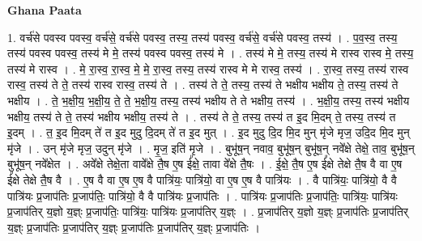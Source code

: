 \documentclass[17pt]{extarticle}
\begin{document}
\textbf{Ghana Paata } \newline

1. वर्च॑से पवस्व पवस्व॒ वर्च॑से॒ वर्च॑से पवस्व॒ तस्य॒ तस्य॑ पवस्व॒ वर्च॑से॒ वर्च॑से पवस्व॒ तस्य॑ । . प॒व॒स्व॒ तस्य॒ तस्य॑ पवस्व पवस्व॒ तस्य॑ मे मे॒ तस्य॑ पवस्व पवस्व॒ तस्य॑ मे । . तस्य॑ मे मे॒ तस्य॒ तस्य॑ मे रास्व रास्व मे॒ तस्य॒ तस्य॑ मे रास्व । . मे॒ रा॒स्व॒ रा॒स्व॒ मे॒ मे॒ रा॒स्व॒ तस्य॒ तस्य॑ रास्व मे मे रास्व॒ तस्य॑ । . रा॒स्व॒ तस्य॒ तस्य॑ रास्व रास्व॒ तस्य॑ ते ते॒ तस्य॑ रास्व रास्व॒ तस्य॑ ते । . तस्य॑ ते ते॒ तस्य॒ तस्य॑ ते भक्षीय भक्षीय ते॒ तस्य॒ तस्य॑ ते भक्षीय । . ते॒ भ॒क्षी॒य॒ भ॒क्षी॒य॒ ते॒ ते॒ भ॒क्षी॒य॒ तस्य॒ तस्य॑ भक्षीय ते ते भक्षीय॒ तस्य॑ । . भ॒क्षी॒य॒ तस्य॒ तस्य॑ भक्षीय भक्षीय॒ तस्य॑ ते ते॒ तस्य॑ भक्षीय भक्षीय॒ तस्य॑ ते । . तस्य॑ ते ते॒ तस्य॒ तस्य॑ त इ॒द मि॒दम् ते॒ तस्य॒ तस्य॑ त इ॒दम् । . त॒ इ॒द मि॒दम् ते॑ त इ॒द मुदु दि॒दम् ते॑ त इ॒द मुत् । . इ॒द मुदु दि॒द मि॒द मुन् मृ॑जे मृज॒ उदि॒द मि॒द मुन् मृ॑जे । . उन् मृ॑जे मृज॒ उदुन् मृ॑जे । . मृ॒ज॒ इति॑ मृजे । . बुभू॑ष॒न् नवाव॒ बुभू॑ष॒न् बुभू॑ष॒न् नवे᳚क्षे तेक्षे॒ ताव॒ बुभू॑ष॒न् बुभू॑ष॒न् नवे᳚क्षेत । . अवे᳚क्षे तेक्षे॒ता वावे᳚क्षे तै॒ष ए॒ष ई᳚क्षे॒ तावा वे᳚क्षे तै॒षः । . ई॒क्षे॒ तै॒ष ए॒ष ई᳚क्षे तेक्षे तै॒ष वै वा ए॒ष ई᳚क्षे तेक्षे तै॒ष वै । . ए॒ष वै वा ए॒ष ए॒ष वै पात्रि॑यः॒ पात्रि॑यो॒ वा ए॒ष ए॒ष वै पात्रि॑यः । . वै पात्रि॑यः॒ पात्रि॑यो॒ वै वै पात्रि॑यः प्र॒जाप॑तिः प्र॒जाप॑तिः॒ पात्रि॑यो॒ वै वै पात्रि॑यः प्र॒जाप॑तिः । . पात्रि॑यः प्र॒जाप॑तिः प्र॒जाप॑तिः॒ पात्रि॑यः॒ पात्रि॑यः प्र॒जाप॑तिर् य॒ज्ञो य॒ज्ञ्ः प्र॒जाप॑तिः॒ पात्रि॑यः॒ पात्रि॑यः प्र॒जाप॑तिर् य॒ज्ञ्ः । . प्र॒जाप॑तिर् य॒ज्ञो य॒ज्ञ्ः प्र॒जाप॑तिः प्र॒जाप॑तिर् य॒ज्ञ्ः प्र॒जाप॑तिः प्र॒जाप॑तिर् य॒ज्ञ्ः प्र॒जाप॑तिः प्र॒जाप॑तिर् य॒ज्ञ्ः प्र॒जाप॑तिः । \newline
\end{document}
